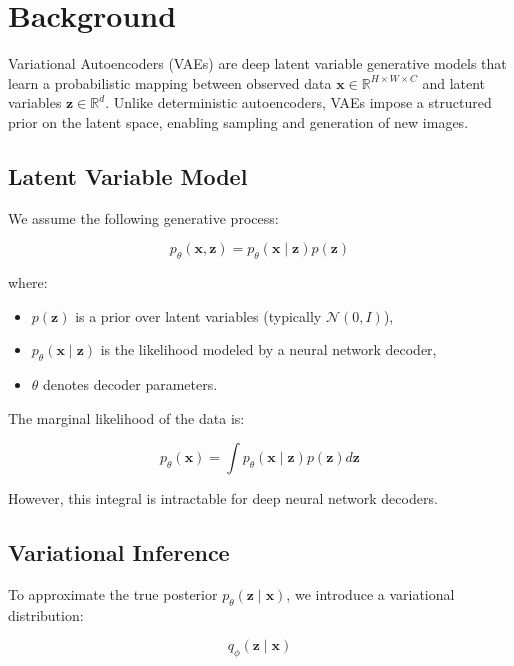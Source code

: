 \section{Background}

Variational Autoencoders (VAEs) are deep latent variable generative models that learn a probabilistic mapping between observed data $\mathbf{x} \in \mathbb{R}^{H \times W \times C}$ and latent variables $\mathbf{z} \in \mathbb{R}^d$. Unlike deterministic autoencoders, VAEs impose a structured prior on the latent space, enabling sampling and generation of new images.

\subsection{Latent Variable Model}

We assume the following generative process:

\begin{equation}
p_\theta(\mathbf{x}, \mathbf{z}) = p_\theta(\mathbf{x} \mid \mathbf{z}) p(\mathbf{z})
\end{equation}

where:

\begin{itemize}
    \item $p(\mathbf{z})$ is a prior over latent variables (typically $\mathcal{N}(0, I)$),
    \item $p_\theta(\mathbf{x} \mid \mathbf{z})$ is the likelihood modeled by a neural network decoder,
    \item $\theta$ denotes decoder parameters.
\end{itemize}

The marginal likelihood of the data is:

\begin{equation}
p_\theta(\mathbf{x}) = \int p_\theta(\mathbf{x} \mid \mathbf{z}) p(\mathbf{z}) d\mathbf{z}
\end{equation}

However, this integral is intractable for deep neural network decoders.

\subsection{Variational Inference}

To approximate the true posterior $p_\theta(\mathbf{z} \mid \mathbf{x})$, we introduce a variational distribution:

\begin{equation}
q_\phi(\mathbf{z} \mid \mathbf{x})
\end{equation}

